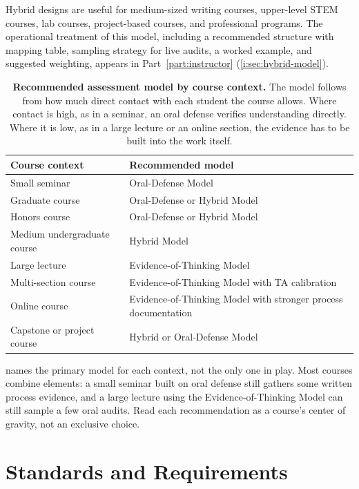 \documentclass{SIAMbook2023}
\begin{document}
Hybrid designs are useful for medium-sized writing courses, upper-level STEM courses, lab courses, project-based courses, and professional programs. The operational treatment of this model, including a recommended structure with mapping table, sampling strategy for live audits, a worked example, and suggested weighting, appears in Part~\ref{part:instructor} (\cref{i:sec:hybrid-model}).

\begin{table}[htbp]
  \centering
  \caption{\textbf{Recommended assessment model by course context.} The model follows from how much direct contact with each student the course allows. Where contact is high, as in a seminar, an oral defense verifies understanding directly. Where it is low, as in a large lecture or an online section, the evidence has to be built into the work itself.}
  \label{u:tab:course-models}
  \begin{tabularx}{\textwidth}{>{\raggedright\arraybackslash}X>{\raggedright\arraybackslash}X}
    \toprule
    Course context & Recommended model \\
    \midrule
    Small seminar & Oral-Defense Model \\
    Graduate course & Oral-Defense or Hybrid Model \\
    Honors course & Oral-Defense or Hybrid Model \\
    Medium undergraduate course & Hybrid Model \\
    Large lecture & Evidence-of-Thinking Model \\
    Multi-section course & Evidence-of-Thinking Model with TA calibration \\
    Online course & Evidence-of-Thinking Model with stronger process documentation \\
    Capstone or project course & Hybrid or Oral-Defense Model \\
    \bottomrule
  \end{tabularx}
\end{table}

 names the primary model for each context, not the only one in play. Most courses combine elements: a small seminar built on oral defense still gathers some written process evidence, and a large lecture using the Evidence-of-Thinking Model can still sample a few oral audits. Read each recommendation as a course's center of gravity, not an exclusive choice.

\chapter{Standards and Requirements}
\label{u:ch:standards-and-requirements}%
\end{document}
